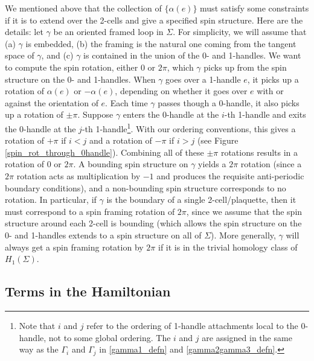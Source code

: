 \documentclass[12pt,a4paper]{article}
\begin{document}
We mentioned above that the collection of $\{\alpha(e)\}$ must satisfy some constraints if it is 
to extend over the 2-cells and give a specified spin structure.
Here are the details:
let $\gamma$ be an oriented framed loop in $\Sigma$.
For simplicity, we will assume that (a) $\gamma$ is embedded, (b) the framing is the natural one coming from the tangent 
space of $\gamma$, and (c) $\gamma$ is contained in the union of the 0- and 1-handles.
We want to compute the spin rotation, either 0 or $2\pi$, which $\gamma$ picks up from the spin structure on the 0- and 1-handles.
When $\gamma$ goes over a 1-handle $e$, it picks up a rotation of $\alpha(e)$ or $-\alpha(e)$, depending on whether it goes over $e$
with or against the orientation of $e$.
Each time $\gamma$ passes though a 0-handle, it also picks up a rotation of $\pm\pi$.
Suppose $\gamma$ enters the 0-handle at the $i$-th 1-handle and exits the 0-handle at the $j$-th 1-handle\footnote{Note that $i$ and $j$ refer to the ordering of 1-handle attachments local to the 0-handle, not to some global ordering. The $i$ and $j$ are assigned in the same way as the $\Gamma_i$ and $\Gamma_j$ in \eqref{gamma1_defn} and \eqref{gamma2gamma3_defn}.}.
With our ordering conventions, this gives a rotation of $+\pi$ if $i<j$ and a rotation of $-\pi$ if $i > j$ (see Figure \ref{spin_rot_through_0handle}).
Combining all of these $\pm\pi$ rotations results in a rotation of 0 or $2\pi$.
A bounding spin structure on $\gamma$ yields a $2\pi$ rotation (since a $2\pi$ rotation acts as 
multiplication by $-1$ and produces the requisite anti-periodic boundary conditions), and a non-bounding 
spin structure corresponds to no rotation.
In particular, if $\gamma$ is the boundary of a single 2-cell/plaquette, then it must correspond to a spin 
framing rotation of $2\pi$, since we assume that the spin structure around each 2-cell is bounding (which 
allows the spin structure on the 0- and 1-handles extends to a spin structure on all of $\Sigma$). 
More generally, $\gamma$ will always get a spin framing rotation by $2\pi$ if it is in the trivial homology 
class of $H_1(\Sigma)$.



\medskip



\subsection{Terms in the Hamiltonian}
\end{document}
